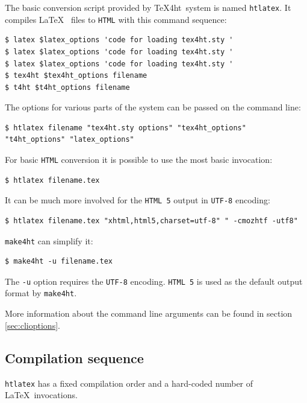 The basic conversion script provided by \TeX4ht~system is named
\texttt{htlatex}. It compiles \LaTeX~ files to \texttt{HTML} with this
command sequence:

\begin{verbatim}
$ latex $latex_options 'code for loading tex4ht.sty '
$ latex $latex_options 'code for loading tex4ht.sty '
$ latex $latex_options 'code for loading tex4ht.sty '
$ tex4ht $tex4ht_options filename
$ t4ht $t4ht_options filename
\end{verbatim}

The options for various parts of the system can be passed on the command
line:

\begin{verbatim}
$ htlatex filename "tex4ht.sty options" "tex4ht_options" "t4ht_options" "latex_options"
\end{verbatim}

For basic \texttt{HTML} conversion it is possible to use the most basic
invocation:

\begin{verbatim}
$ htlatex filename.tex
\end{verbatim}

It can be much more involved for the \texttt{HTML\ 5} output in
\texttt{UTF-8} encoding:

\begin{verbatim}
$ htlatex filename.tex "xhtml,html5,charset=utf-8" " -cmozhtf -utf8"
\end{verbatim}

\texttt{make4ht} can simplify it:

\begin{verbatim}
$ make4ht -u filename.tex
\end{verbatim}

The \texttt{-u} option requires the \texttt{UTF-8} encoding.
\texttt{HTML\ 5} is used as the default output format by
\texttt{make4ht}.

More information about the command line arguments can be found in
section \ref{sec:clioptions}.

\subsection{Compilation sequence}\label{compilation-sequence}

\texttt{htlatex} has a fixed compilation order and a hard-coded number
of \LaTeX~invocations.

